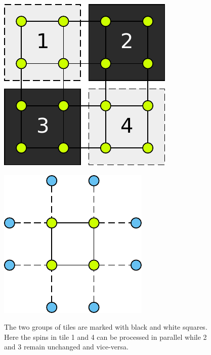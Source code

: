 \documentclass[paper=a4, fontsize=11pt]{scrartcl} %
\numberwithin{equation}{section} %
\numberwithin{figure}{section} %
\numberwithin{table}{section} %
\begin{document}
\begin{figure}
\centering
\begin{minipage}{.65\textwidth}
  \centering
  \includegraphics[width=.5\linewidth]{images/4x4.pdf}
  \caption{The two groups of tiles are marked with black and white squares. Here the spins in tile 1 and 4 can be processed in parallel while 2 and 3 remain unchanged and vice-versa.}
  \label{fig:checker_grid}
\end{minipage}
\hspace{0.05\linewidth}
\begin{minipage}{.25\textwidth}
  \centering
  \includegraphics[width=1\linewidth]{images/2D_ghosts.pdf}
  \label{fig:gost_cells}
\end{minipage}
\end{figure}
\end{document}
